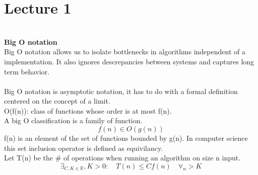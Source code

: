 \documentclass[12pt]{article}
\newcommand{\sect}[1]{\section*{#1}}
\begin{document}
\sect{Lecture 1}\\
\textbf{Big O notation}\\
Big O notation allows us to isolate bottlenecks in algorithms independent of a implementation. It also ignores descrepancies between systems and captures long term behavior. \\\\
Big O notation is asymptotic notation, it has to do with a formal definition centered on the concept of a limit. \\
O(f(n)): class of functions whose order is at most f(n).\\
A big O classification is a family of function.
\[
  f(n) \in O(g(n))
\]
f(n) is an element of the set of functions bounded by g(n). In computer science this set inclusion operator is defined as equivilancy. \\
Let T(n) be the # of operations when running an algorithm on size n input.
\[
   \exists_{C,K \in \mathbb{R}}, K>0 : \quad T(n)\leq Cf(n)\quad \forall_n>K
\]
\end{document}
